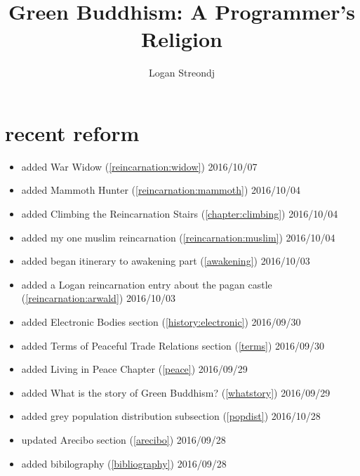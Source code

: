 \documentclass[10pt]{report}
\title{Green Buddhism: A Programmer's Religion}
\author{Logan Streondj \\
  \doclicenseName}
\begin{document}
\maketitle

\section{recent reform}
\begin{itemize}
  \item added War Widow (\ref{reincarnation:widow}) 2016/10/07
  \item added Mammoth Hunter (\ref{reincarnation:mammoth}) 2016/10/04
  \item added Climbing the Reincarnation Stairs (\ref{chapter:climbing})
2016/10/04
  \item added my one muslim reincarnation (\ref{reincarnation:muslim})
2016/10/04
  \item added began itinerary to awakening part (\ref{awakening}) 2016/10/03
  \item added a Logan reincarnation entry about the pagan castle
(\ref{reincarnation:arwald}) 2016/10/03
  \item added Electronic Bodies section (\ref{history:electronic}) 2016/09/30
  \item added Terms of Peaceful Trade Relations section (\ref{terms}) 2016/09/30
  \item added Living in Peace Chapter (\ref{peace}) 2016/09/29
  \item added What is the story of Green Buddhism? (\ref{whatstory}) 2016/09/29
  \item added grey population distribution subsection (\ref{popdist})
2016/10/28
 \item updated Arecibo section (\ref{arecibo}) 2016/09/28
 \item added bibilography (\ref{bibliography}) 2016/09/28
\end{itemize}
\tableofcontents
 




\printbibliography{}
\label{bibliography}
\end{document}
